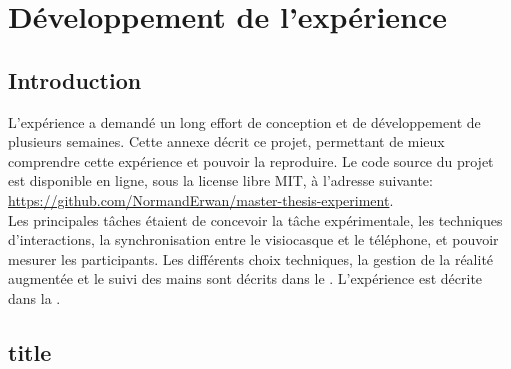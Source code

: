 \chapter{Développement de l'expérience}
\label{appendix:experiment}

\section{Introduction}
L'expérience a demandé un long effort de conception et de développement de plusieurs semaines. Cette annexe décrit ce projet, permettant de mieux comprendre cette expérience et pouvoir la reproduire. Le code source du projet est disponible en ligne, sous la license libre MIT, à l'adresse suivante: \url{https://github.com/NormandErwan/master-thesis-experiment}.\\
Les principales tâches étaient de concevoir la tâche expérimentale, les techniques d'interactions, la synchronisation entre le visiocasque et le téléphone, et pouvoir mesurer les participants. Les différents choix techniques, la gestion de la réalité augmentée et le suivi des mains sont décrits dans le . L'expérience est décrite dans la .

\section{title}